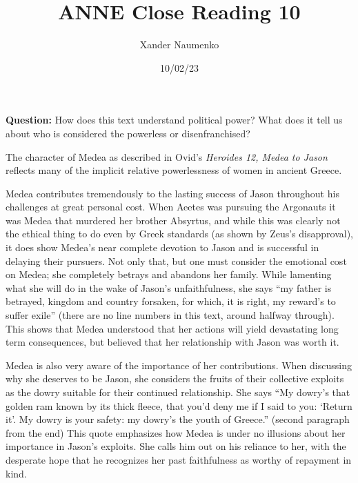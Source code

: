\documentclass[letterpaper, reqno,11pt]{article}
\begin{document}
\title{ANNE Close Reading 10}
\date{10/02/23}
\author{Xander Naumenko}
\maketitle

{\bf Question:} How does this text understand political power? What does it tell us about who is considered the powerless or disenfranchised?

\medskip

The character of Medea as described in Ovid's {\em Heroides 12, Medea to Jason} reflects many of the implicit relative powerlessness of women in ancient Greece.

\medskip

Medea contributes tremendously to the lasting success of Jason throughout his challenges at great personal cost. When Aeetes was pursuing the Argonauts it was Medea that murdered her brother Absyrtus, and while this was clearly not the ethical thing to do even by Greek standards (as shown by Zeus's disapproval), it does show Medea's near complete devotion to Jason and is successful in delaying their pursuers. Not only that, but one must consider the emotional cost on Medea; she completely betrays and abandons her family. While lamenting what she will do in the wake of Jason's unfaithfulness, she says ``my father is betrayed, kingdom and country forsaken, for which, it is right, my reward's to suffer exile'' (there are no line numbers in this text, around halfway through). This shows that Medea understood that her actions will yield devastating long term consequences, but believed that her relationship with Jason was worth it. 

\medskip

Medea is also very aware of the importance of her contributions. When discussing why she deserves to be Jason, she considers the fruits of their collective exploits as the dowry suitable for their continued relationship. She says ``My dowry’s that golden ram known by its thick fleece, that you’d deny me if I said to you: `Return it'. My dowry is your safety: my dowry’s the youth of Greece.'' (second paragraph from the end) This quote emphasizes how Medea is under no illusions about her importance in Jason's exploits. She calls him out on his reliance to her, with the desperate hope that he recognizes her past faithfulness as worthy of repayment in kind.

\medskip
\end{document}
